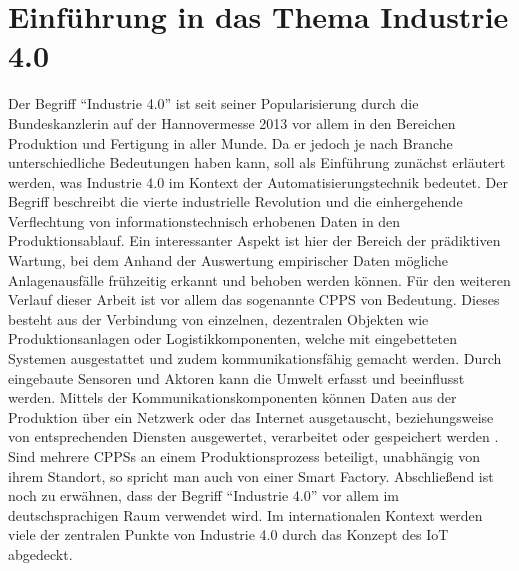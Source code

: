 \chapter{Einführung in das Thema Industrie 4.0}

Der Begriff "`Industrie 4.0"' ist seit seiner Popularisierung durch die Bundeskanzlerin auf der Hannovermesse 2013 vor allem in den Bereichen Produktion und Fertigung in aller Munde. Da er jedoch je nach Branche unterschiedliche Bedeutungen haben kann, soll als Einführung zunächst erläutert werden, was Industrie 4.0 im Kontext der Automatisierungstechnik bedeutet.
Der Begriff beschreibt die vierte industrielle Revolution und die einhergehende Verflechtung von informationstechnisch erhobenen Daten in den Produktionsablauf. Ein interessanter Aspekt ist hier der Bereich der prädiktiven Wartung, bei dem Anhand der Auswertung empirischer Daten mögliche Anlagenausfälle frühzeitig erkannt und behoben werden können.
Für den weiteren Verlauf dieser Arbeit ist vor allem das sogenannte \ac{CPPS} von Bedeutung. Dieses besteht aus der Verbindung von einzelnen, dezentralen Objekten wie Produktionsanlagen oder Logistikkomponenten, welche mit eingebetteten Systemen ausgestattet und zudem kommunikationsfähig gemacht werden. Durch eingebaute Sensoren und Aktoren kann die Umwelt erfasst und beeinflusst werden. Mittels der Kommunikationskomponenten können Daten aus der Produktion über ein Netzwerk oder das Internet ausgetauscht, beziehungsweise von entsprechenden Diensten ausgewertet, verarbeitet oder gespeichert werden
\cite{Bauerhansl2014}.\\[4pt]
Sind mehrere \aclp{CPPS} an einem Produktionsprozess beteiligt, unabhängig von ihrem Standort, so spricht man auch von einer Smart Factory.
Abschließend ist noch zu erwähnen, dass der Begriff "`Industrie 4.0"' vor allem im deutschsprachigen Raum verwendet wird. Im internationalen Kontext werden viele der zentralen Punkte von Industrie 4.0 durch das Konzept des \ac{IoT} abgedeckt.
\clearpage




